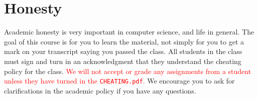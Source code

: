 \section{Honesty}

Academic honesty is very important in computer science, and life in
general. The goal of this course is for you to learn the material, not
simply for you to get a mark on your transcript saying you passed the
class. All students in the class must sign and turn in an acknowledgment
that they understand the cheating policy for the class.
\textcolor{red}{We will not accept or grade any assignments from a
student unless they have turned in the \texttt{CHEATING.pdf}.} We
encourage you to ask for clarifications in the academic policy if you
have any questions.
